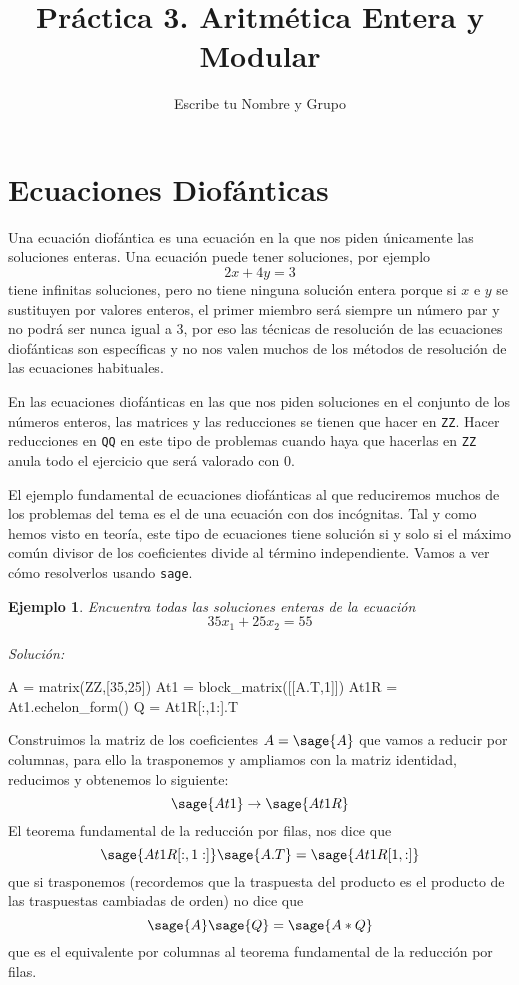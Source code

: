 \documentclass{amsart}
\title{Práctica 3. Aritmética Entera y Modular}
\author{Escribe tu Nombre y Grupo}
\newtheorem{ejem}{Ejemplo}
\begin{document}
\maketitle

\section{Ecuaciones Diofánticas}

Una ecuación diofántica es una ecuación en la que nos piden únicamente las
soluciones enteras. Una ecuación puede tener soluciones, por ejemplo
$$ 2x + 4y = 3 $$
tiene infinitas soluciones, pero no tiene ninguna solución entera porque
si $x$ e $y$ se sustituyen por valores enteros, el primer miembro será 
siempre un número par y no podrá ser nunca igual a $3$, por eso las técnicas
de resolución de las ecuaciones diofánticas son específicas y no nos valen
muchos de los métodos de resolución de las ecuaciones habituales.

\begin{tcolorbox}[title = Importante]
En las ecuaciones diofánticas en las que nos piden soluciones en el 
conjunto de los números enteros, las matrices y las reducciones se 
tienen que hacer en \verb|ZZ|. Hacer reducciones en \verb|QQ| en este
tipo de problemas cuando haya que hacerlas en \verb|ZZ| anula todo el
ejercicio que será valorado con $0$.
\end{tcolorbox} 

El ejemplo fundamental de ecuaciones diofánticas al que reduciremos 
muchos de los problemas del tema es el de una ecuación con dos incógnitas.
Tal y como hemos visto en teoría, este tipo de ecuaciones tiene solución
si y solo si el máximo común divisor de los coeficientes divide al término
independiente. Vamos a ver cómo resolverlos usando \verb|sage|.

\begin{ejem}
Encuentra todas las soluciones enteras de la ecuación
$$ 35 x_1 + 25 x_2 = 55 $$
\end{ejem} 

{\it Solución:}

\begin{sageblock}
A = matrix(ZZ,[35,25])
At1 = block_matrix([[A.T,1]])
At1R = At1.echelon_form()
Q = At1R[:,1:].T
\end{sageblock}

Construimos la matriz de los coeficientes $A = \sage{A}$ que vamos a 
reducir por columnas, para ello la trasponemos y ampliamos con la 
matriz identidad, reducimos y obtenemos lo siguiente:
$$ \sage{At1} \to \sage{At1R}$$
El teorema fundamental de la reducción por filas, nos dice que 
$$ \sage{At1R[:,1:]} \sage{A.T} = \sage{At1R[1,:]}$$
que si trasponemos (recordemos que la traspuesta del producto es 
el producto de las traspuestas cambiadas de orden) no dice que 
$$ \sage{A} \sage{Q} = \sage{A*Q} $$
que es el equivalente por columnas al teorema fundamental de la 
reducción por filas. 
\end{document}
